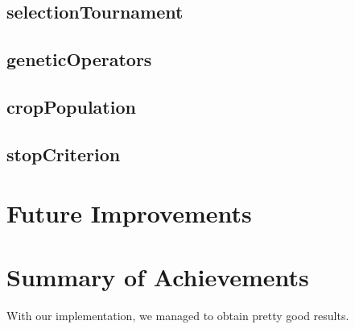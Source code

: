 
\subsection{selectionTournament} \label{selectionTournament}
\subsection{geneticOperators} \label{geneticOperators}
\subsection{cropPopulation} \label{cropPopulation}
\subsection{stopCriterion} \label{stopCriterion}

\section{Future Improvements}
\section{Summary of  Achievements}\label{summary}

With our implementation, we managed to obtain pretty good results. 
